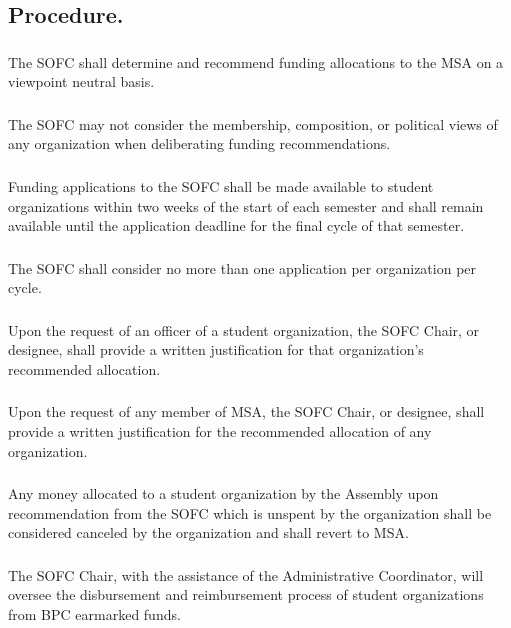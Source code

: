 \subsection{Procedure.}
\subsubsection{}
The SOFC shall determine and recommend funding allocations to the MSA on a viewpoint neutral basis.
\subsubsection{}
The SOFC may not consider the membership, composition, or political views of any organization when deliberating funding recommendations.
\subsubsection{}
Funding applications to the SOFC shall be made available to student organizations within two weeks of the start of each semester and shall remain available until the application deadline for the final cycle of that semester.
\subsubsection{}
The SOFC shall consider no more than one application per organization per cycle.
\subsubsection{}
Upon the request of an officer of a student organization, the SOFC Chair, or designee, shall provide a written justification for that organization's recommended allocation.
\subsubsection{}
Upon the request of any member of MSA, the SOFC Chair, or designee, shall provide a written justification for the recommended allocation of any organization.
\subsubsection{}
Any money allocated to a student organization by the Assembly upon recommendation from the SOFC which is unspent by the organization shall be considered canceled by the organization and shall revert to MSA.
\subsubsection{}
The SOFC Chair, with the assistance of the Administrative Coordinator, will oversee the disbursement and reimbursement process of student organizations from BPC earmarked funds.

